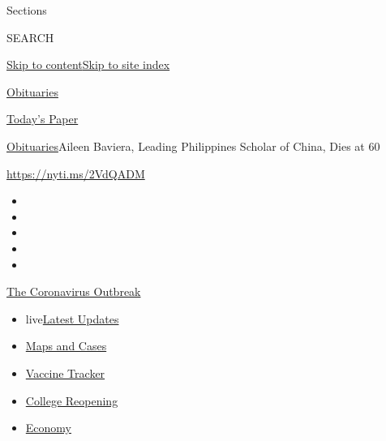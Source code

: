 Sections

SEARCH

\protect\hyperlink{site-content}{Skip to
content}\protect\hyperlink{site-index}{Skip to site index}

\href{https://www.nytimes3xbfgragh.onion/section/obituaries}{Obituaries}

\href{https://myaccount.nytimes3xbfgragh.onion/auth/login?response_type=cookie\&client_id=vi}{}

\href{https://www.nytimes3xbfgragh.onion/section/todayspaper}{Today's
Paper}

\href{/section/obituaries}{Obituaries}\textbar{}Aileen Baviera, Leading
Philippines Scholar of China, Dies at 60

\url{https://nyti.ms/2VdQADM}

\begin{itemize}
\item
\item
\item
\item
\item
\end{itemize}

\href{https://www.nytimes3xbfgragh.onion/news-event/coronavirus?action=click\&pgtype=Article\&state=default\&region=TOP_BANNER\&context=storylines_menu}{The
Coronavirus Outbreak}

\begin{itemize}
\tightlist
\item
  live\href{https://www.nytimes3xbfgragh.onion/2020/08/04/world/coronavirus-covid-19.html?action=click\&pgtype=Article\&state=default\&region=TOP_BANNER\&context=storylines_menu}{Latest
  Updates}
\item
  \href{https://www.nytimes3xbfgragh.onion/interactive/2020/us/coronavirus-us-cases.html?action=click\&pgtype=Article\&state=default\&region=TOP_BANNER\&context=storylines_menu}{Maps
  and Cases}
\item
  \href{https://www.nytimes3xbfgragh.onion/interactive/2020/science/coronavirus-vaccine-tracker.html?action=click\&pgtype=Article\&state=default\&region=TOP_BANNER\&context=storylines_menu}{Vaccine
  Tracker}
\item
  \href{https://www.nytimes3xbfgragh.onion/2020/08/02/us/covid-college-reopening.html?action=click\&pgtype=Article\&state=default\&region=TOP_BANNER\&context=storylines_menu}{College
  Reopening}
\item
  \href{https://www.nytimes3xbfgragh.onion/live/2020/08/03/business/stock-market-today-coronavirus?action=click\&pgtype=Article\&state=default\&region=TOP_BANNER\&context=storylines_menu}{Economy}
\end{itemize}

